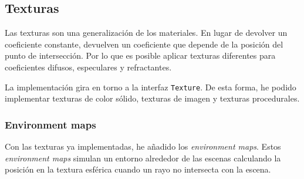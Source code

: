 \documentclass{article}
\begin{document}
\subsection{Texturas}
Las texturas son una generalización de los materiales. En lugar de devolver un
coeficiente constante, devuelven un coeficiente que depende de la posición del
punto de intersección. Por lo que es posible aplicar texturas diferentes para
coeficientes difusos, especulares y refractantes.

La implementación gira en torno a la interfaz \texttt{Texture}. De esta forma,
he podido implementar texturas de color sólido, texturas de imagen y texturas
procedurales.

\subsubsection{Environment maps}

Con las texturas ya implementadas, he añadido los \textit{environment maps}.
Estos \textit{environment maps} simulan un entorno alrededor de las escenas
calculando la posición en la textura esférica cuando un rayo no intersecta con
la escena.
\end{document}
